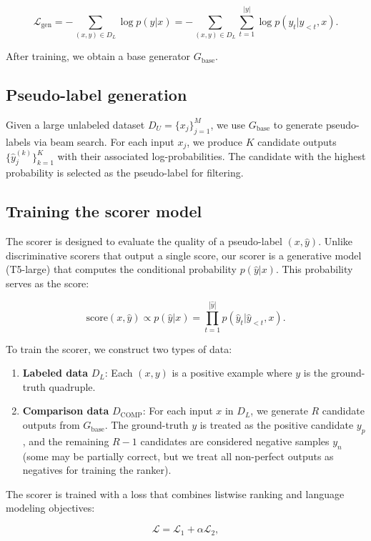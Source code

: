 \documentclass{article}
\begin{document}
\[
\mathcal{L}_{\text{gen}} = - \sum_{(x,y) \in D_L} \log p(y|x) = - \sum_{(x,y) \in D_L} \sum_{t=1}^{|y|} \log p(y_t | y_{<t}, x).
\]

After training, we obtain a base generator \(G_{\text{base}}\).

\subsection{Pseudo-label generation}

Given a large unlabeled dataset \(D_U = \{x_j\}_{j=1}^{M}\), we use \(G_{\text{base}}\) to generate pseudo-labels via beam search. For each input \(x_j\), we produce \(K\) candidate outputs \(\{\hat{y}_{j}^{(k)}\}_{k=1}^{K}\) with their associated log-probabilities. The candidate with the highest probability is selected as the pseudo-label for filtering.

\subsection{Training the scorer model}

The scorer is designed to evaluate the quality of a pseudo-label \((x, \hat{y})\). Unlike discriminative scorers that output a single score, our scorer is a generative model (T5-large) that computes the conditional probability \(p(\hat{y}|x)\). This probability serves as the score:

\[
\text{score}(x, \hat{y}) \propto p(\hat{y}|x) = \prod_{t=1}^{|\hat{y}|} p(\hat{y}_t | \hat{y}_{<t}, x).
\]

To train the scorer, we construct two types of data:
\begin{enumerate}
    \item \textbf{Labeled data} \(D_L\): Each \((x, y)\) is a positive example where \(y\) is the ground-truth quadruple.
    \item \textbf{Comparison data} \(D_{\text{COMP}}\): For each input \(x\) in \(D_L\), we generate \(R\) candidate outputs from \(G_{\text{base}}\). The ground-truth \(y\) is treated as the positive candidate \(y_p\), and the remaining \(R-1\) candidates are considered negative samples \(y_n\) (some may be partially correct, but we treat all non-perfect outputs as negatives for training the ranker).
\end{enumerate}

The scorer is trained with a loss that combines listwise ranking and language modeling objectives:

\[
\mathcal{L} = \mathcal{L}_1 + \alpha \mathcal{L}_2,
\]
\end{document}
